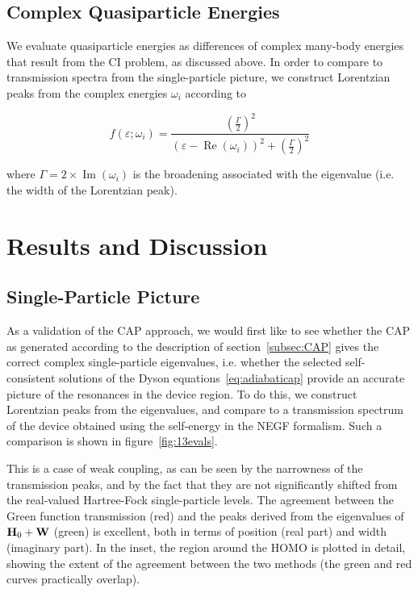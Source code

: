 \subsection{Complex Quasiparticle Energies}

We evaluate quasiparticle energies as differences of complex many-body energies
that result from the \ac{CI} problem, as discussed above. In order to compare
to transmission spectra from the single-particle picture, we construct
Lorentzian peaks from the complex energies $\omega_i$ according to

\begin{equation}
	f(\varepsilon;\omega_i)
	= \frac{\left( \frac{\Gamma}{2} \right)^2}
	       {(\varepsilon - \operatorname{Re}(\omega_i))^2
	       + \left( \frac{\Gamma}{2} \right)^2}
	\label{eq:lobro}
\end{equation}

where $\Gamma = 2 \times \operatorname{Im}(\omega_i)$ is the broadening
associated with the eigenvalue (i.e. the width of the Lorentzian peak).

\section{Results and Discussion}
\label{sec:results}

\subsection{Single-Particle Picture}
\label{subsec:SingleParticle}

As a validation of the \ac{CAP} approach, we would first like to see whether
the \ac{CAP} as generated according to the description of
section~\ref{subsec:CAP} gives the correct complex single-particle eigenvalues,
i.e. whether the selected self-consistent solutions of the Dyson
equations~\ref{eq:adiabaticap} provide an accurate picture of the resonances
in the device region. To do this, we construct Lorentzian peaks from the
eigenvalues, and compare to a transmission spectrum of the device obtained
using the self-energy in the \ac{NEGF} formalism. Such a comparison is shown in
figure~\ref{fig:13evals}.

This is a case of weak coupling, as can be seen by the narrowness of the
transmission peaks, and by the fact that they are not significantly shifted
from the real-valued Hartree-Fock single-particle levels. The agreement between
the Green function transmission (red) and the peaks derived from the
eigenvalues of $\mathbf{H}_0 + \mathbf{W}$ (green) is excellent, both in terms of
position (real part) and width (imaginary part). In the inset, the region
around the \ac{HOMO} is plotted in detail, showing the extent of the agreement
between the two methods (the green and red curves practically overlap).

